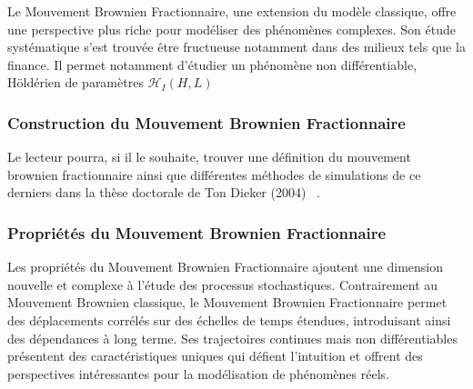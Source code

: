 Le Mouvement Brownien Fractionnaire, une extension du modèle classique, offre une perspective plus riche pour modéliser des phénomènes complexes. Son étude systématique s'est trouvée être fructueuse notamment dans des milieux tels que la finance. Il permet notamment d'étudier un phénomène non différentiable, Höldérien de paramètres $\mathcal H_I (H, L)$


\subsubsection{Construction du Mouvement Brownien Fractionnaire}
Le lecteur pourra, si il le souhaite, trouver une définition du mouvement brownien fractionnaire ainsi que différentes méthodes de simulations de ce derniers dans la thèse doctorale de Ton Dieker (2004) ~\cite{dieker2004simulation}.
\citer{
Un mouvement Brownien fractionnaire normalisé $B_H = \{ B_H(t) : t\in \mathds R_+, H \in ]0,1[ \,\}$ est caractérisé de façon unique par :
$$
	\begin{array}{l}
		\textsf{les incréments de } B_H(t) \textsf{ sont stationnaires }
		\\
		B_H(0) = 0
		\\
		\forall t \in \mathds R_+ \quad \esperance{B_H(t)} = 0
		\\
		\forall t \in \mathds R_+ \quad \mathds E |B_H(t)|^2 = t^{2H} = \sigma^2_H(t)
		\\
		\forall t > 0 \quad B_H(t) \sim \mathcal N(0, \sigma^2_H(t) )
		\\
		C_{B_H}(u,v) = \esperance{B_H(u)B_H(v)} = \frac 1 2 \bigl[ u^{2H} + v^{2H} + |u-v|^{2H}  \bigr]
	\end{array}
$$

\begin{flushright}
	source : Diecker, 2004 ~\cite{dieker2004simulation}
\end{flushright}
}

\subsubsection{Propriétés du Mouvement Brownien Fractionnaire}

Les propriétés du Mouvement Brownien Fractionnaire ajoutent une dimension nouvelle et complexe à l'étude des processus stochastiques. Contrairement au Mouvement Brownien classique, le Mouvement Brownien Fractionnaire permet des déplacements corrélés sur des échelles de temps étendues, introduisant ainsi des dépendances à long terme. Ses trajectoires continues mais non différentiables présentent des caractéristiques uniques qui défient l'intuition et offrent des perspectives intéressantes pour la modélisation de phénomènes réels.

